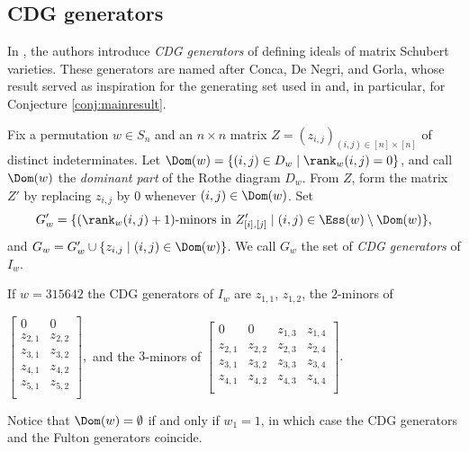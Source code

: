 \subsection{CDG generators}\label{subsect:CDG}

In \cite{HPW}, the authors introduce \emph{CDG generators} of defining ideals of matrix Schubert varieties.  These generators are named after Conca, De Negri, and Gorla, whose result \cite[Theorem 4.2]{CDG15} served as inspiration for the generating set used in \cite{HPW} and, in particular, for Conjecture \ref{conj:mainresult}.

\begin{definition}
Fix a permutation $w \in S_n$ and an $n \times n$ matrix $Z = (z_{i,j})_{(i,j) \in [n] \times [n]}$ of distinct indeterminates.  Let $\Dom(w) = \{(i,j) \in D_w \mid \rank_w(i,j) = 0\}$, and call $\Dom(w)$ the \emph{dominant part} of the Rothe diagram $D_w$.  From $Z$, form the matrix $Z'$ by replacing $z_{i,j}$ by $0$ whenever $(i,j) \in \Dom(w)$.  Set \[
	G'_w = \{(\rank_w(i,j)+1)\text{-minors in } Z'_{[i],[j]} \mid (i,j) \in \Ess(w)\setminus \Dom(w) \},
\] and $G_w = G'_w \cup \{z_{i,j} \mid (i,j) \in \Dom(w)\}$.  We call $G_w$ the set of \emph{CDG generators} of $I_w$.
\end{definition}

\begin{example}
If $w = 315642$ the CDG generators of $I_w$ are $z_{1,1}$, $z_{1,2}$, the $2$-minors of \begin{center} $\begin{bmatrix}
0 & 0\\
z_{2,1} & z_{2,2}\\
z_{3,1} & z_{3,2}\\
z_{4,1} & z_{4,2}\\
z_{5,1} & z_{5,2}\\
\end{bmatrix},
$ and the $3$-minors of  $\begin{bmatrix}
0 & 0 & z_{1,3} & z_{1,4}\\
z_{2,1} & z_{2,2} & z_{2,3} & z_{2,4}\\
z_{3,1} & z_{3,2} & z_{3,3} & z_{3,4}\\
z_{4,1} & z_{4,2} & z_{4,3} & z_{4,4}\\
\end{bmatrix}.
$ \end{center}
\end{example}

\noindent Notice that $\Dom(w) = \emptyset$ if and only if $w_1 = 1$, in which case the CDG generators and the Fulton generators coincide.  

